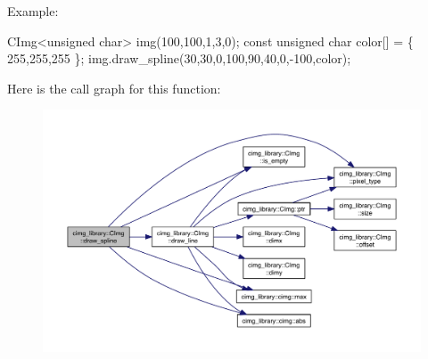 \begin{DoxyParagraph}{Example\-:}

\begin{DoxyCode}
CImg<unsigned char> img(100,100,1,3,0);
\textcolor{keyword}{const} \textcolor{keywordtype}{unsigned} \textcolor{keywordtype}{char} color[] = \{ 255,255,255 \};
img.draw\_spline(30,30,0,100,90,40,0,-100,color);
\end{DoxyCode}
 
\end{DoxyParagraph}


Here is the call graph for this function\-:
\nopagebreak
\begin{figure}[H]
\begin{center}
\leavevmode
\includegraphics[width=350pt]{structcimg__library_1_1_c_img_ae227ca08fc15c1e543e92d0778c218d7_cgraph}
\end{center}
\end{figure}


